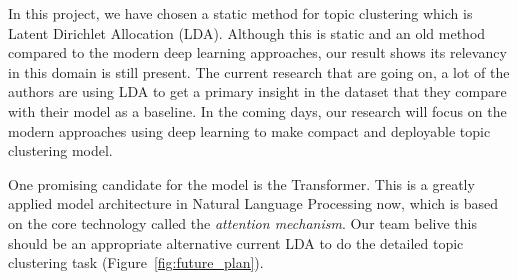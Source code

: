 In this project, we have chosen a static method for topic clustering which is
Latent Dirichlet Allocation (LDA). Although this is static and an old method
compared to the modern deep learning approaches, our result shows its
relevancy in this domain is still present. The current research that are
going on, a lot of the authors are using LDA to get a primary insight in the
dataset that they compare with their model as a baseline. In the coming days,
our research will focus on the modern approaches using deep learning to make
compact and deployable topic clustering model.

One promising candidate for the model is the Transformer. This is a greatly
applied model architecture in Natural Language Processing now, which is based
on the core technology called the \textit{attention mechanism}. Our team
belive this should be an appropriate alternative current LDA to do the
detailed topic clustering task (Figure~\ref{fig:future_plan}). 